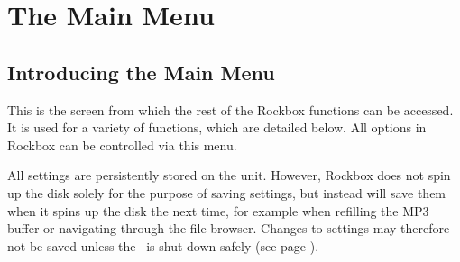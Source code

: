 \chapter{The Main Menu}

\section{Introducing the Main Menu}
This is the screen from which the rest of the Rockbox functions can be accessed. It is used for a variety of functions, which are detailed below. All options in Rockbox can be controlled via this menu.

All settings are persistently stored on the unit. However, Rockbox does not spin up the disk solely for the purpose of saving settings, but instead will save them when it spins up the disk the next time, for example when refilling the MP3 buffer or navigating through the file browser. Changes to settings may therefore not be saved unless the \dap\ is shut down safely (see page \pageref{ref:Safeshutdown}).

